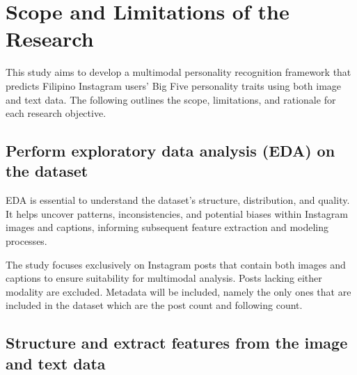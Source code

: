 %
%




\section{Scope and Limitations of the Research}
\label{sec:scopelimitations}


	This study aims to develop a multimodal personality recognition framework that predicts Filipino Instagram users’ Big Five personality traits using both image and text data. The following outlines the scope, limitations, and rationale for each research objective.
	\subsection{Perform exploratory data analysis (EDA) on the dataset}
	
	EDA is essential to understand the dataset’s structure, distribution, and quality. It helps uncover patterns, inconsistencies, and potential biases within Instagram images and captions, informing subsequent feature extraction and modeling processes.
	
	The study focuses exclusively on Instagram posts that contain both images and captions to ensure suitability for multimodal analysis. Posts lacking either modality are excluded. Metadata will be included, namely the only ones that are included in the dataset which are the post count and following count.
	
	\subsection{Structure and extract features from the image and text data}
	

